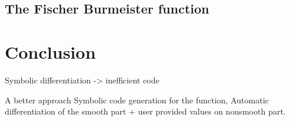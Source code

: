 \documentclass[a4paper]{article}
\begin{document}
\subsection{The Fischer Burmeister function}

\section{Conclusion}

Symbolic differentiation -> inefficient code

A better approach Symbolic code generation for the function, Automatic
differentiation of the smooth part + user provided values on nonsmooth part.





\end{document}
